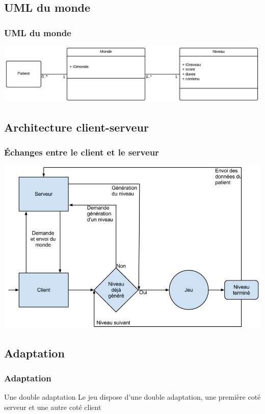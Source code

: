 \documentclass{beamer}
\begin{document}
\subsection{UML du monde}

\begin{frame}
\frametitle{UML du monde}

\centering \includegraphics[scale=0.25]{images/uml_monde.png}

\end{frame}

\subsection{Architecture client-serveur}
\begin{frame}
\frametitle{Échanges entre le client et le serveur}
\centering \includegraphics[scale=0.27]{images/client-serveur.png}

\end{frame}

\subsection{Adaptation}
\begin{frame}
\frametitle{Adaptation}

\begin{block}{Une double adaptation}
Le jeu dispose d'une double adaptation, une première coté serveur et une autre coté client
\end{block}

\end{frame}
\end{document}
